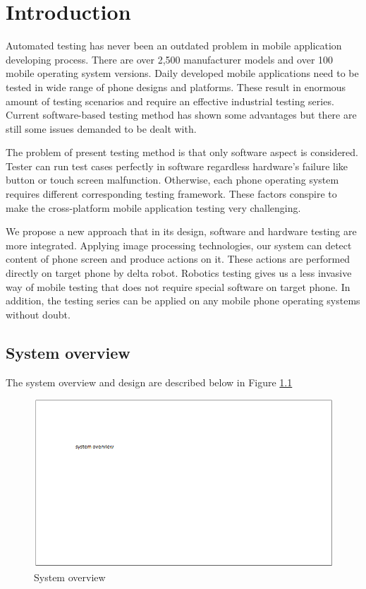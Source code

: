 \chapter{Introduction}

Automated testing has never been an outdated problem in mobile application developing process. There are over 2,500 manufacturer models and over 100 mobile operating system versions\cite{crittercism}. Daily developed mobile applications need to be tested in wide range of phone designs and platforms. These result in enormous amount of testing scenarios and require an effective industrial testing series. Current software-based testing method has shown some advantages but there are still some issues demanded to be dealt with.

The problem of present testing method is that only software aspect is considered. Tester can run test cases perfectly in software regardless hardware's failure like button or touch screen malfunction. Otherwise, each phone operating system requires different corresponding testing framework. These factors conspire to make the cross-platform mobile application testing very challenging. \nocite{weinman_thesis}

We propose a new approach that in its design, software and hardware testing are more integrated. Applying image processing technologies, our system can detect content of phone screen and produce actions on it. These actions are performed directly on target phone by delta robot. Robotics testing gives us a less invasive way of mobile testing that does not require special software on target phone. In addition, the testing series can be applied on any mobile phone operating systems without doubt.

\section{System overview}
The system overview and design are described below in Figure \ref{fig:sys_overview}
	\begin{figure}
		\centering
		\includegraphics[scale=0.75]{Chapters/Fig/sys_overview.png}
		\caption{System overview}
		\label{fig:sys_overview}
	\end{figure}

